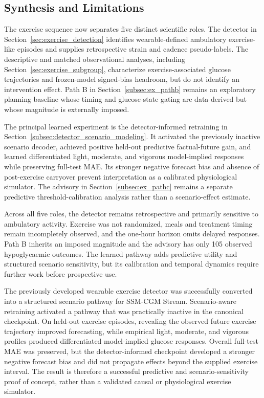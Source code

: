 

\subsection{Synthesis and Limitations}
\label{subsec:ex_synthesis}

The exercise sequence now separates five distinct scientific roles. The
detector in Section~\ref{sec:exercise_detection} identifies wearable-defined
ambulatory exercise-like episodes and supplies retrospective strain and cadence
pseudo-labels. The descriptive and matched observational analyses, including
Section~\ref{sec:exercise_subgroup}, characterize exercise-associated glucose
trajectories and frozen-model signed-bias headroom, but do not identify an
intervention effect. Path B in Section~\ref{subsec:ex_pathb} remains an
exploratory planning baseline whose timing and glucose-state gating are
data-derived but whose magnitude is externally imposed.

The principal learned experiment is the detector-informed retraining in
Section~\ref{subsec:detector_scenario_modeling}. It activated the previously
inactive scenario decoder, achieved positive held-out predictive
factual-future gain, and learned differentiated light, moderate, and vigorous
model-implied responses while preserving full-test MAE. Its stronger negative
forecast bias and absence of post-exercise carryover prevent interpretation as
a calibrated physiological simulator. The advisory in
Section~\ref{subsec:ex_pathc} remains a separate predictive
threshold-calibration analysis rather than a scenario-effect estimate.

Across all five roles, the detector remains retrospective and primarily
sensitive to ambulatory activity. Exercise was not randomized, meals and
treatment timing remain incompletely observed, and the one-hour horizon omits
delayed responses. Path B inherits an imposed magnitude and the advisory has
only 105 observed hypoglycaemic outcomes. The learned pathway adds predictive
utility and structured scenario sensitivity, but its calibration and temporal
dynamics require further work before prospective use.

The previously developed wearable exercise detector was successfully converted
into a structured scenario pathway for SSM-CGM Stream. Scenario-aware
retraining activated a pathway that was practically inactive in the canonical
checkpoint. On held-out exercise episodes, revealing the observed future
exercise trajectory improved forecasting, while empirical light, moderate,
and vigorous profiles produced differentiated model-implied glucose responses.
Overall full-test MAE was preserved, but the detector-informed checkpoint
developed a stronger negative forecast bias and did not propagate effects
beyond the supplied exercise interval. The result is therefore a successful
predictive and scenario-sensitivity proof of concept, rather than a validated
causal or physiological exercise simulator.
